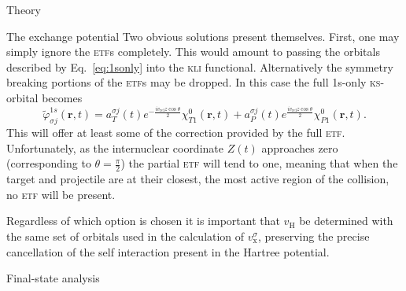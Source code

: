 \documentclass[aps, pra, reprint, groupedaddress, amsfonts, longbibliography,
               amsmath, amssymb, showpacs, nofootinbib]{revtex4-1}
\begin{document}
\begin{section}{Theory \label{sec:theory}}
\begin{subsection}{The exchange potential \label{sec:xpot}}
      Two obvious solutions present themselves. First, one may simply ignore the \textsc{etf}s
      completely. This would amount to passing the orbitals described by Eq.~\eqref{eq:1sonly} into
      the \textsc{kli} functional. Alternatively the symmetry breaking portions of the \textsc{etf}s
      may be dropped. In this case the full 1s-only \textsc{ks}-orbital becomes
      \begin{equation} \label{eq:1sonlyetf}
         \tilde{\varphi}_{\sigma j}^{1s} (\mathbf{r},t) =
                       a^{\sigma j}_T (t)  e^{- \frac{i v_\mathrm{rel} z \cos \theta}{2}}
                                           \chi^{0}_{T1} (\mathbf{r},t)
                     + a^{\sigma j}_P (t)  e^{  \frac{i v_\mathrm{rel} z \cos \theta}{2}}
                                           \chi^{0}_{P1} (\mathbf{r},t).
      \end{equation}
      This will offer at least some of the correction provided by the full \textsc{etf}. Unfortunately,
      as the internuclear coordinate $Z(t)$ approaches zero (corresponding to $\theta = \frac{\pi}{2}$)
      the partial \textsc{etf} will tend to one, meaning that when the target and projectile are at
      their closest, the most active region of the collision, no \textsc{etf} will be present. 
      
      Regardless of which option is chosen it is important that $v_\mathrm{H}$ be determined with the
      same set of orbitals used in the calculation of $v_\mathrm{x}^\sigma$, preserving the precise
      cancellation of the self interaction present in the Hartree potential.

   \end{subsection}

   \begin{subsection}{Final-state analysis \label{sec:probs}}


\end{subsection}
\end{section}
\end{document}

